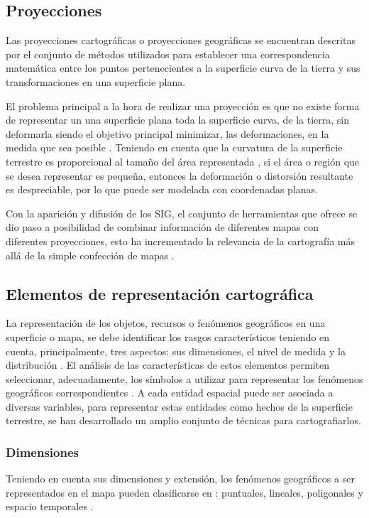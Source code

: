 \subsection{Proyecciones}
Las proyecciones cartográficas o proyecciones geográficas se encuentran descritas por el conjunto
de métodos utilizados para establecer una correspondencia matemática entre los puntos pertenecientes a la superficie curva de la tierra y sus transformaciones en una superficie plana.

El problema principal a la hora de realizar una proyección es que no existe forma de representar
un una superficie plana toda la superficie curva, de la tierra, sin deformarla siendo el objetivo
principal minimizar, las deformaciones, en la medida que sea posible \citep{fAlonsoSig2006}.
Teniendo en cuenta que la curvatura de la superficie terrestre es
proporcional al tamaño del área representada \citep{llopis2006sistemas}, si el área o región que se
desea representar es pequeña, entonces la deformación o distorsión resultante es despreciable, por
lo que puede ser modelada con coordenadas planas.

Con la aparición y difusión de los SIG, el conjunto de herramientas que ofrece se dio paso a
posibilidad de combinar información de diferentes mapas con diferentes proyecciones, esto ha
incrementado la relevancia de la cartografía más allá de la simple confección de mapas
\citep{llopis2006sistemas}.

\subsection{Elementos de representación cartográfica}
La representación de los objetos, recursos o fenómenos geográficos en una superficie o mapa, se
debe identificar los rasgos característicos teniendo en cuenta, principalmente, tres aspectos:
sus dimensiones, el nivel de medida y la distribución \citep{fomentoConceptos2010}. El análisis de
las características de estos elementos permiten seleccionar, adecuadamente, los símbolos a
utilizar para representar los fenómenos geográficos correspondientes \citep{fomentoConceptos2010}.
A cada entidad espacial puede ser asociada a diversas variables, para representar estas entidades
como hechos de la superficie terrestre, se han desarrollado un amplio conjunto de técnicas para
cartografiarlos.

\subsubsection{Dimensiones}
Teniendo en cuenta sus dimensiones y extensión, los fenómenos geográficos a ser representados en el
mapa pueden clasificarse en : puntuales, lineales, poligonales y espacio temporales
\citep{fAlonsoSig2006}.

